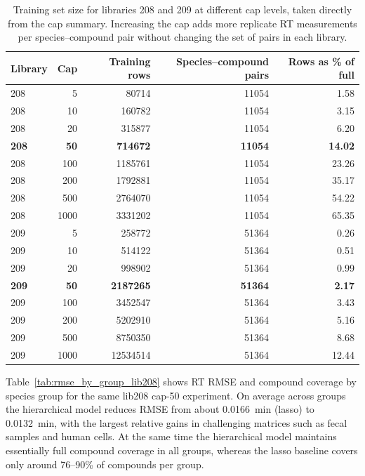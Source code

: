 \documentclass[11pt]{article}
\begin{document}
\begin{table}[H]
\centering
\begin{tabular}{lrrrr}
\hline
Library & Cap & Training rows & Species--compound pairs & Rows as \% of full \\
\hline
208 & 5    & 80714   & 11054 & 1.58 \\
208 & 10   & 160782  & 11054 & 3.15 \\
208 & 20   & 315877  & 11054 & 6.20 \\
\textbf{208} & \textbf{50}   & \textbf{714672}  & \textbf{11054} & \textbf{14.02} \\
208 & 100  & 1185761 & 11054 & 23.26 \\
208 & 200  & 1792881 & 11054 & 35.17 \\
208 & 500  & 2764070 & 11054 & 54.22 \\
208 & 1000 & 3331202 & 11054 & 65.35 \\
209 & 5    & 258772  & 51364 & 0.26 \\
209 & 10   & 514122  & 51364 & 0.51 \\
209 & 20   & 998902  & 51364 & 0.99 \\
\textbf{209} & \textbf{50}   & \textbf{2187265} & \textbf{51364} & \textbf{2.17} \\
209 & 100  & 3452547 & 51364 & 3.43 \\
209 & 200  & 5202910 & 51364 & 5.16 \\
209 & 500  & 8750350 & 51364 & 8.68 \\
209 & 1000 & 12534514 & 51364 & 12.44 \\
\hline
\end{tabular}
\caption{Training set size for libraries 208 and 209 at different cap levels, taken
directly from the cap summary. Increasing the cap adds more replicate RT measurements
per species--compound pair without changing the set of pairs in each library.}
\label{tab:cap_rows}
\end{table}

Table~\ref{tab:rmse_by_group_lib208} shows RT RMSE and compound coverage by species
group for the same lib208 cap-50 experiment. On average across groups the hierarchical
model reduces RMSE from about 0.0166~min (lasso) to 0.0132~min, with the largest
relative gains in challenging matrices such as fecal samples and human cells. At the
same time the hierarchical model maintains essentially full compound coverage in all
groups, whereas the lasso baseline covers only around 76--90\% of compounds per
group.
\end{document}
